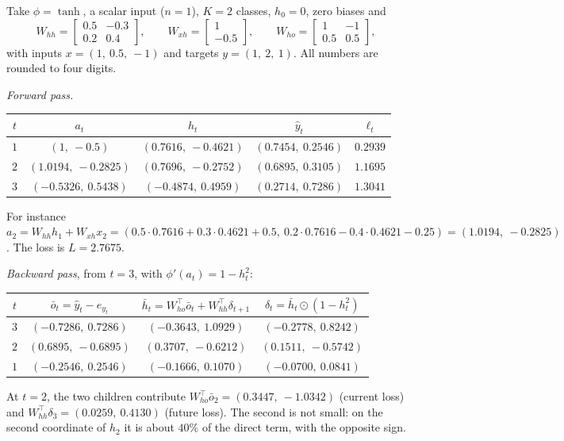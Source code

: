 \begin{notechapter}
\begin{example}[BPTT with $m = 2$, $T = 3$]\label{rnn-bptt:ex:numbers}
Take $\phi = \tanh$, a scalar input ($n = 1$), $K = 2$ classes, $h_0 = 0$, zero biases and
\[
  W_{hh} = \begin{bmatrix}0.5 & -0.3\\ 0.2 & 0.4\end{bmatrix},\qquad
  W_{xh} = \begin{bmatrix}1\\ -0.5\end{bmatrix},\qquad
  W_{ho} = \begin{bmatrix}1 & -1\\ 0.5 & 0.5\end{bmatrix},
\]
with inputs $x = (1,\ 0.5,\ -1)$ and targets $y = (1,\ 2,\ 1)$. All numbers are rounded to four digits.

\emph{Forward pass.}
\begin{center}
\begin{tabular}{c|cccc}
$t$ & $a_t$ & $h_t$ & $\hat y_t$ & $\ell_t$\\\hline
$1$ & $(1,\ -0.5)$ & $(0.7616,\ -0.4621)$ & $(0.7454,\ 0.2546)$ & $0.2939$\\
$2$ & $(1.0194,\ -0.2825)$ & $(0.7696,\ -0.2752)$ & $(0.6895,\ 0.3105)$ & $1.1695$\\
$3$ & $(-0.5326,\ 0.5438)$ & $(-0.4874,\ 0.4959)$ & $(0.2714,\ 0.7286)$ & $1.3041$
\end{tabular}
\end{center}
For instance $a_2 = W_{hh}h_1 + W_{xh}x_2 = (0.5\cdot0.7616 + 0.3\cdot0.4621 + 0.5,\ 0.2\cdot0.7616 - 0.4\cdot0.4621 - 0.25) = (1.0194,\ -0.2825)$. The
loss is $L = 2.7675$.

\emph{Backward pass}, from $t = 3$, with $\phi'(a_t) = 1 - h_t^2$:
\begin{center}
\begin{tabular}{c|ccc}
$t$ & $\bar o_t = \hat y_t - e_{y_t}$ & $\bar h_t = W_{ho}^\top\bar o_t + W_{hh}^\top\delta_{t+1}$ & $\delta_t = \bar h_t\odot(1 - h_t^2)$\\\hline
$3$ & $(-0.7286,\ 0.7286)$ & $(-0.3643,\ 1.0929)$ & $(-0.2778,\ 0.8242)$\\
$2$ & $(0.6895,\ -0.6895)$ & $(0.3707,\ -0.6212)$ & $(0.1511,\ -0.5742)$\\
$1$ & $(-0.2546,\ 0.2546)$ & $(-0.1666,\ 0.1070)$ & $(-0.0700,\ 0.0841)$
\end{tabular}
\end{center}
At $t = 2$, the two children contribute $W_{ho}^\top\bar o_2 = (0.3447,\ -1.0342)$ (current loss) and
$W_{hh}^\top\delta_3 = (0.0259,\ 0.4130)$ (future loss). The second is not small: on the second
coordinate of $h_2$ it is about $40\%$ of the direct term, with the opposite sign.


\end{example}
\end{notechapter}
